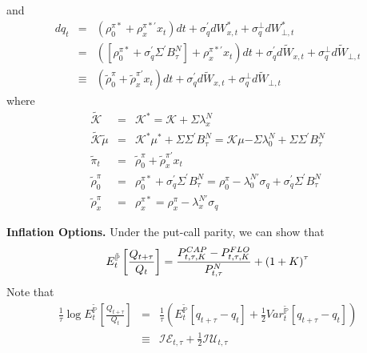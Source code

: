 \documentclass{article}
\begin{document}
and%
\begin{eqnarray*}
dq_{t} &=&\left( \rho _{0}^{\pi \ast }+\rho _{x}^{\pi \ast \prime
}x_{t}\right) dt+\sigma _{q}^{\prime }dW_{x,t}^{\ast }+\sigma _{q}^{\bot
}dW_{\bot ,t}^{\ast } \\
&=&\left( \left[ \rho _{0}^{\pi \ast }+\sigma _{q}^{\prime }\Sigma ^{\prime
}B_{\tau }^{N}\right] +\rho _{x}^{\pi \ast \prime }x_{t}\right) dt+\sigma
_{q}^{\prime }d\tilde{W}_{x,t}+\sigma _{q}^{\bot }d\tilde{W}_{\bot ,t} \\
&\equiv &\left( \widetilde{\rho }_{0}^{\pi }+\widetilde{\rho }_{x}^{\pi
\prime }x_{t}\right) dt+\sigma _{q}^{\prime }d\tilde{W}_{x,t}+\sigma
_{q}^{\bot }d\tilde{W}_{\bot ,t}
\end{eqnarray*}%
where 
\begin{eqnarray*}
\mathcal{\tilde{K}} &=&\mathcal{K}^{\ast }=\mathcal{K+}\Sigma \lambda
_{x}^{N} \\
\mathcal{\tilde{K}}\tilde{\mu} &=&\mathcal{K}^{\ast }\mu ^{\ast }+\Sigma
\Sigma ^{\prime }B_{\tau }^{N}=\mathcal{K}\mu \mathcal{-}\Sigma \lambda
_{0}^{N}+\Sigma \Sigma ^{\prime }B_{\tau }^{N} \\
\tilde{\pi}_{t} &=&\widetilde{\rho }_{0}^{\pi }+\widetilde{\rho }_{x}^{\pi
\prime }x_{t} \\
\widetilde{\rho }_{0}^{\pi } &=&\rho _{0}^{\pi \ast }+\sigma _{q}^{\prime
}\Sigma ^{\prime }B_{\tau }^{N}=\rho _{0}^{\pi }-\lambda _{0}^{N\prime
}\sigma _{q}+\sigma _{q}^{\prime }\Sigma ^{\prime }B_{\tau }^{N} \\
\widetilde{\rho }_{x}^{\pi } &=&\rho _{x}^{\pi \ast }=\rho _{x}^{\pi
}-\lambda _{x}^{N\prime }\sigma _{q}
\end{eqnarray*}

\textbf{Inflation Options.} Under the put-call parity, we can show that 
\begin{equation*}
E_{t}^{\mathbb{\tilde{P}}}\left[ \frac{Q_{t+\tau }}{Q_{t}}\right] =\frac{%
P_{t,\tau ,K}^{CAP}-P_{t,\tau ,K}^{FLO}}{P_{t,\tau }^{N}}+\left( 1+K\right)
^{\tau }
\end{equation*}%
Note that 
\begin{eqnarray*}
\frac{1}{\tau }\log E_{t}^{\mathbb{\tilde{P}}}\left[ \frac{Q_{t+\tau }}{Q_{t}%
}\right]  &=&\frac{1}{\tau }\left( E_{t}^{\mathbb{\tilde{P}}}\left[
q_{t+\tau }-q_{t}\right] +\frac{1}{2}Var_{t}^{\mathbb{\tilde{P}}}\left[
q_{t+\tau }-q_{t}\right] \right)  \\
&\equiv &\mathcal{IE}_{t,\tau }+\frac{1}{2}\mathcal{IU}_{t,\tau }
\end{eqnarray*}
\end{document}
